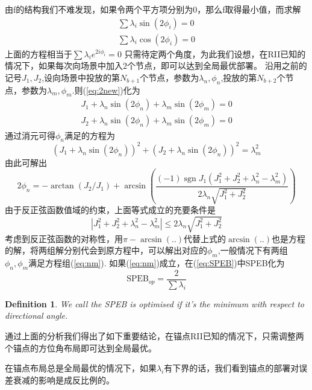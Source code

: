 \documentclass[12pt]{article}
\newtheorem{definition}{Definition}
\DeclareMathOperator{\sgn}{sgn}
\theoremstyle{remark}
\begin{document}
由f的结构我们不难发现，如果令两个平方项分别为0，那么f取得最小值，而求解
\begin{equation}\label{eq:2new}
\begin{split}
\sum \lambda_i \sin(2\phi_i)=0\\
\sum \lambda_i \cos(2\phi_i)=0
\end{split}
\end{equation}
上面的方程相当于$\sum \lambda_i e^{2i\phi_i}=0$
只需待定两个角度，为此我们设想，在RII已知的情况下，如果每次向场景中加入2个节点，即可以达到全局最优部署。
沿用之前的记号$J_1,J_2$,设向场景中投放的第$N_{b+1}$个节点，参数为$\lambda_n,\phi_n$,投放的第$N_{b+2}$个节点，参数为$\lambda_m,\phi_m$.则(\ref{eq:2new})化为
\begin{equation}
\begin{split}
J_1+\lambda_n \sin(2\phi_n)+\lambda_m \sin(2\phi_m)=0\\
J_2+\lambda_n \sin(2\phi_n)+\lambda_m \sin(2\phi_m)=0
\end{split}
\end{equation}
通过消元可得$\phi_n$满足的方程为
\begin{equation}\label{eq:nm}
(J_1+\lambda_n \sin(2\phi_n))^2+(J_2+\lambda_n \sin(2\phi_n))^2=\lambda_m^2
\end{equation}
由此可解出
\begin{equation}
2\phi_n=-\arctan(J_2/J_1)+\arcsin(\frac{(-1)\sgn{J_1}(J_1^2+J_2^2+\lambda_n^2-\lambda_m^2)}{2\lambda_n \sqrt{J_1^2+J_2^2}})
\end{equation}
由于反正弦函数值域的约束，上面等式成立的充要条件是\[|J_1^2+J_2^2+\lambda_n^2-\lambda_m^2|\leq 2\lambda_n\sqrt{J_1^2+J_2^2}\]
考虑到反正弦函数的对称性，用$\pi-\arcsin(..)$代替上式的$\arcsin(..)$也是方程的解，将两组解分别代会到原方程中，可以解出对应的$\phi_m$,一般情况下有两组$\phi_n,\phi_m$满足方程组(\ref{eq:nm}).
如果(\ref{eq:nm})成立，在(\ref{eq:SPEB})中SPEB化为
\begin{equation}
\text{SPEB}_{op}=\frac{2}{\sum \lambda_i}
\end{equation}
\begin{definition}
We call the SPEB is optimised if it's the minimum with respect to directional angle.
\end{definition}

通过上面的分析我们得出了如下重要结论，在锚点RII已知的情况下，只需调整两个锚点的方位角布局即可达到全局最优。

在锚点布局总是全局最优的情况下，如果$\lambda_i$有下界的话，我们看到锚点的部署对误差衰减的影响是成反比例的。
\end{document}

